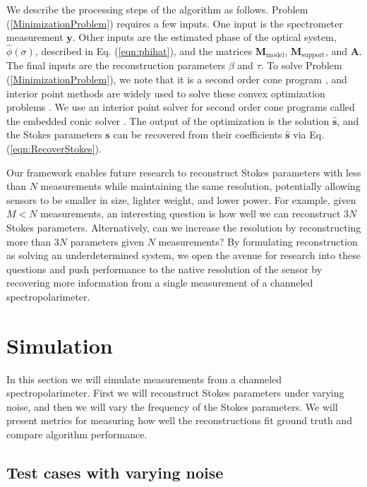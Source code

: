 \documentclass[10pt]{article}
\numberwithin{equation}{subsection}
\newcommand{\lbf}[1]{\ensuremath{{\boldsymbol #1}}}
\begin{document}
We describe the processing steps of the algorithm as follows.
Problem (\ref{MinimizationProblem}) requires a few inputs. One input is the spectrometer measurement $\lbf y$.
Other inputs are the estimated phase of the optical system, $\widehat{\phi}(\sigma)$, described in Eq. (\ref{eqn:phihat}), and the matrices $\lbf M_{\text{model}}$, $\lbf M_{\text{support}}$, and $\lbf A$.
The final inputs are the reconstruction parameters $\beta$ and $\tau$.
To solve Problem (\ref{MinimizationProblem}), we note that it is a second order cone program \cite{Boyd04}, and interior point methods are widely used to solve these convex optimization problems \cite{Boyd04, Wright97}.
We use an interior point solver for second order cone programs called the embedded conic solver \cite{Domahidi13}.
The output of the optimization is the solution $\widehat{\lbf s}$,
and the Stokes parameters $\lbf s$ can be recovered from their coefficients $\widehat{\lbf s}$ via Eq. (\ref{eqn:RecoverStokes}).

    Our framework enables future research to reconstruct Stokes parameters with less than $N$ measurements while maintaining the same resolution, potentially allowing sensors to be smaller in size, lighter weight, and lower power.
For example, given $M < N$ measurements, an interesting question is how well we can reconstruct $3 N$ Stokes parameters.
Alternatively, can we increase the resolution by reconstructing more than $3 N$ parameters given $N$ measurements?
By formulating reconstruction as solving an underdetermined system, we open the avenue for research into these questions and push performance to the native resolution of the sensor by recovering more information from a single measurement of a channeled spectropolarimeter.

\section{Simulation}\label{SectionSimulation}

In this section we will simulate measurements from a channeled spectropolarimeter.
First we will reconstruct Stokes parameters under varying noise, and then we will vary the frequency of the Stokes parameters.
We will present metrics for measuring how well the reconstructions fit ground truth and compare algorithm performance.

\subsection{Test cases with varying noise}\label{SectionSNR}
\end{document}
